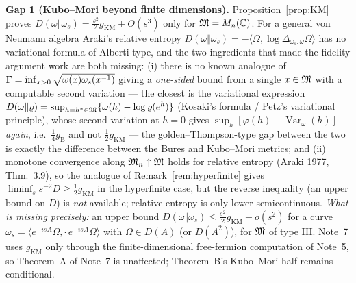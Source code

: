 \documentclass[11pt]{article}
\newcommand{\Om}{\Omega}
\newcommand{\Var}{\operatorname{Var}}
\newcommand{\gB}{g_{\mathrm B}}
\newcommand{\gKM}{g_{\mathrm{KM}}}
\newcommand{\ip}[2]{\langle #1,#2\rangle}
\begin{document}
\begin{verdictgap}
\textbf{Gap 1 (Kubo--Mori beyond finite dimensions).}  Proposition~\ref{prop:KM} proves
$D(\omega\Vert\omega_s)=\frac{s^2}2\gKM+O(s^3)$ only for $\mathfrak M=M_n(\mathbb C)$.  For a general von Neumann algebra
Araki's relative entropy $D(\omega\Vert\omega_s)=-\ip{\Om}{\log\Delta_{\omega_s,\omega}\Om}$ has no variational
formula of Alberti type, and the two ingredients that made the fidelity argument work are both missing:
(i) there is no known analogue of $\operatorname{F}=\inf_{x>0}\sqrt{\omega(x)\omega_s(x^{-1})}$ giving a \emph{one-sided} bound
from a single $x\in\mathfrak M$ with a computable second variation --- the closest is the variational expression
$D(\omega\Vert\varrho)=\sup_{h=h^*\in\mathfrak M}\{\omega(h)-\log\varrho(e^h)\}$ (Kosaki's formula / Petz's variational
principle), whose second variation at $h=0$ gives $\sup_h[\varphi(h)-\Var_\omega(h)]$ \emph{again}, i.e.\
$\tfrac14\gB$ and not $\tfrac12\gKM$ --- the golden--Thompson-type gap between the two is exactly the difference
between the Bures and Kubo--Mori metrics; and (ii) monotone convergence along $\mathfrak M_n\uparrow\mathfrak M$ holds for relative
entropy (Araki 1977, Thm.~3.9), so the analogue of Remark~\ref{rem:hyperfinite} gives
$\liminf_s s^{-2}D\ge\frac12\gKM$ in the hyperfinite case, but the reverse inequality (an upper bound on $D$) is
\emph{not} available; relative entropy is only lower semicontinuous.  \emph{What is missing precisely:} an upper
bound $D(\omega\Vert\omega_s)\le\frac{s^2}2\gKM+o(s^2)$ for a curve $\omega_s=\ip{e^{-isA}\Om}{\cdot\,e^{-isA}\Om}$
with $\Om\in D(A)$ (or $D(A^2)$), for $\mathfrak M$ of type III.  Note~7 uses $\gKM$ only through the finite-dimensional
free-fermion computation of Note~5, so Theorem~A of Note~7 is unaffected; Theorem~B's Kubo--Mori half remains
conditional.
\end{verdictgap}
\end{document}
